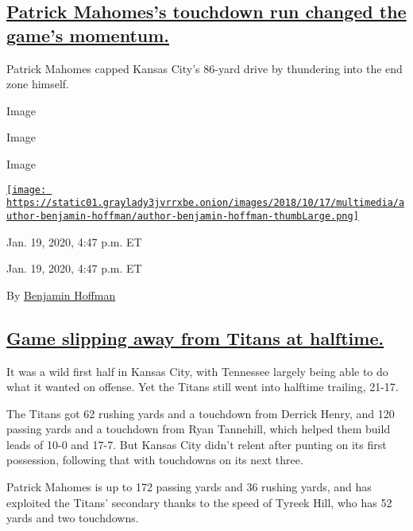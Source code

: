 \hypertarget{patrick-mahomess-touchdown-run-changed-the-games-momentum}{%
\subsection{\texorpdfstring{\protect\hyperlink{patrick-mahomess-touchdown-run-changed-the-games-momentum}{Patrick
Mahomes's touchdown run changed the game's
momentum.}}{Patrick Mahomes's touchdown run changed the game's momentum.}}\label{patrick-mahomess-touchdown-run-changed-the-games-momentum}}

Patrick Mahomes capped Kansas City's 86-yard drive by thundering into
the end zone himself.

Image

Image

Image

\href{https://www.nytimes3xbfgragh.onion/by/benjamin-hoffman}{\texttt{[image: https://static01.graylady3jvrrxbe.onion/images/2018/10/17/multimedia/author-benjamin-hoffman/author-benjamin-hoffman-thumbLarge.png]}}

Jan. 19, 2020, 4:47 p.m. ET

Jan. 19, 2020, 4:47 p.m. ET

By
\href{https://www.nytimes3xbfgragh.onion/by/benjamin-hoffman}{Benjamin
Hoffman}

\hypertarget{game-slipping-away-from-titans-at-halftime}{%
\subsection{\texorpdfstring{\protect\hyperlink{game-slipping-away-from-titans-at-halftime}{Game
slipping away from Titans at
halftime.}}{Game slipping away from Titans at halftime.}}\label{game-slipping-away-from-titans-at-halftime}}

It was a wild first half in Kansas City, with Tennessee largely being
able to do what it wanted on offense. Yet the Titans still went into
halftime trailing, 21-17.

The Titans got 62 rushing yards and a touchdown from Derrick Henry, and
120 passing yards and a touchdown from Ryan Tannehill, which helped them
build leads of 10-0 and 17-7. But Kansas City didn't relent after
punting on its first possession, following that with touchdowns on its
next three.

Patrick Mahomes is up to 172 passing yards and 36 rushing yards, and has
exploited the Titans' secondary thanks to the speed of Tyreek Hill, who
has 52 yards and two touchdowns.

